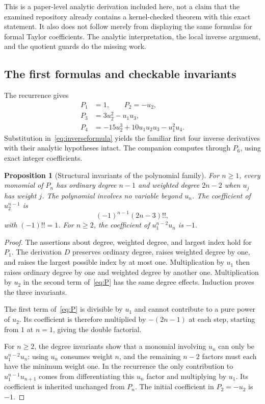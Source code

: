 \documentclass[11pt,a4paper]{article}
\newtheorem{proposition}[theorem]{Proposition}
\theoremstyle{definition}\newtheorem{definition}[theorem]{Definition}
\theoremstyle{remark}\newtheorem{remark}[theorem]{Remark}
\begin{document}
This is a paper-level analytic derivation included here, not a claim that the examined repository already contains a kernel-checked theorem with this exact statement. It also does not follow merely from displaying the same formulas for formal Taylor coefficients. The analytic interpretation, the local inverse argument, and the quotient guards do the missing work.

\subsection{The first formulas and checkable invariants}
The recurrence gives
\begin{align*}
 P_1&=1,\qquad P_2=-u_2,\\
 P_3&=3u_2^2-u_1u_3,\\
 P_4&=-15u_2^3+10u_1u_2u_3-u_1^2u_4.
\end{align*}
Substitution in~\eqref{eq:inverseformula} yields the familiar first four inverse derivatives with their analytic hypotheses intact. The companion computes through $P_6$, using exact integer coefficients.

\begin{proposition}[Structural invariants of the polynomial family]
For $n\ge1$, every monomial of $P_n$ has ordinary degree $n-1$ and weighted degree $2n-2$ when $u_j$ has weight $j$. The polynomial involves no variable beyond $u_n$. The coefficient of $u_2^{n-1}$ is
\[
 (-1)^{n-1}(2n-3)!!,
\]
with $(-1)!!=1$. For $n\ge2$, the coefficient of $u_1^{n-2}u_n$ is $-1$.
\end{proposition}
\begin{proof}
The assertions about degree, weighted degree, and largest index hold for $P_1$. The derivation $D$ preserves ordinary degree, raises weighted degree by one, and raises the largest possible index by at most one. Multiplication by $u_1$ then raises ordinary degree by one and weighted degree by another one. Multiplication by $u_2$ in the second term of~\eqref{eq:P} has the same degree effects. Induction proves the three invariants.

The first term of~\eqref{eq:P} is divisible by $u_1$ and cannot contribute to a pure power of $u_2$. Its coefficient is therefore multiplied by $-(2n-1)$ at each step, starting from $1$ at $n=1$, giving the double factorial.

For $n\ge2$, the degree invariants show that a monomial involving $u_n$ can only be $u_1^{n-2}u_n$: using $u_n$ consumes weight $n$, and the remaining $n-2$ factors must each have the minimum weight one. In the recurrence the only contribution to $u_1^{n-1}u_{n+1}$ comes from differentiating this $u_n$ factor and multiplying by $u_1$. Its coefficient is inherited unchanged from $P_n$. The initial coefficient in $P_2=-u_2$ is $-1$.
\end{proof}
\end{document}
